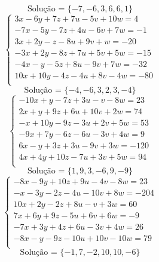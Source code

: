 \documentclass[12pt,oneside,a4paper]{article}
\begin{document}
\begin{equation*}
\text{Solução = }\{-7,-6,3,6,6,1\}
\end{equation*}
\vspace{\baselineskip}
\begin{equation*}
\begin{cases}
3x-6y+7z+7u-5v+10w=4 \\
-7x-5y-7z+4u-6v+7w=-1 \\
3x+2y-z-8u+9v+w=-20 \\
-3x+2y-8z+7u+5v+5w=-15 \\
-4x-y-5z+8u-9v+7w=-32 \\
10x+10y-4z-4u+8v-4w=-80 \\
\end{cases}
\end{equation*}
\begin{equation*}
\text{Solução = }\{-4,-6,3,2,3,-4\}
\end{equation*}
\vspace{\baselineskip}
\begin{equation*}
\begin{cases}
-10x+y-7z+3u-v-8w=23 \\
2x+y+9z+6u+10v+2w=74 \\
-x+10y-9z-3u+2v+5w=53 \\
-9x+7y-6z-6u-3v+4w=9 \\
6x-y+3z+3u-9v+3w=-120 \\
4x+4y+10z-7u+3v+5w=94 \\
\end{cases}
\end{equation*}
\begin{equation*}
\text{Solução = }\{1,9,3,-6,9,-9\}
\end{equation*}
\vspace{\baselineskip}
\begin{equation*}
\begin{cases}
-8x-9y+10z+9u-4v-8w=23 \\
-x-3y-2z-4u-10v+8w=-204 \\
10x+2y-2z+8u-v+3w=60 \\
7x+6y+9z-5u+6v+6w=-9 \\
-7x+3y+4z+6u-3v+4w=26 \\
-8x-y-9z-10u+10v-10w=79 \\
\end{cases}
\end{equation*}
\begin{equation*}
\text{Solução = }\{-1,7,-2,10,10,-6\}
\end{equation*}
\end{document}
